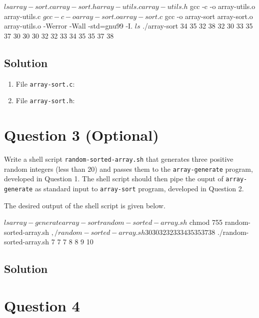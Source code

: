 \documentclass[12pt,letterpaper,twoside]{article}
\begin{document}
\begin{terminal}
$ ls
array-sort.c array-sort.h array-utils.c array-utils.h
$ gcc -c -o array-utils.o array-utils.c 
$ gcc -c -o array-sort.o array-sort.c 
$ gcc -o array-sort array-sort.o array-utils.o -Werror -Wall -std=gnu99 -I.
$ ls
$ ./array-sort 34 35 32 38 32 30 33 35 37 30
30 30 32 32 33 34 35 35 37 38
\end{terminal}

\subsection*{Solution}

\lstset{language=c,tabsize=4}
\begin{enumerate}
\item File \texttt{array-sort.c}:

\item File \texttt{array-sort.h}:

\end{enumerate}

\section*{Question 3 (Optional)}

Write a shell script \texttt{random-sorted-array.sh} that generates three positive random integers (less than 20) and passes them to the \texttt{array-generate} program, developed in Question 1.
The shell script should then pipe the ouput of \texttt{array-generate} as standard input to \texttt{array-sort} program, developed in Question 2.

The desired output of the shell script is given below.

\begin{terminal}
$ ls
array-generate array-sort random-sorted-array.sh
$ chmod 755 random-sorted-array.sh
$ ,/random-sorted-array.sh
30 30 32 32 33 34 35 35 37 38
$ ./random-sorted-array.sh
7 7 7 8 8 9 10
\end{terminal}

\subsection*{Solution}

\lstset{language=bash,tabsize=4}


\section*{Question 4}
\end{document}
